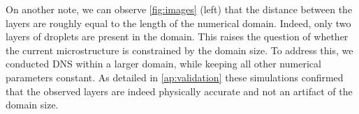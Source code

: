 
On another note, we can observe \ref{fig:images} (left) that the distance between
the layers are roughly equal to the length of the numerical domain. 
Indeed, only two layers of droplets are present in the domain.
This raises the question of whether the current microstructure is constrained by the domain size. 
To address this, we conducted DNS within a larger domain, while keeping all other numerical parameters constant.
As detailed in  \ref{ap:validation} these simulations confirmed that the observed layers are indeed physically accurate and not an artifact of the domain size.

